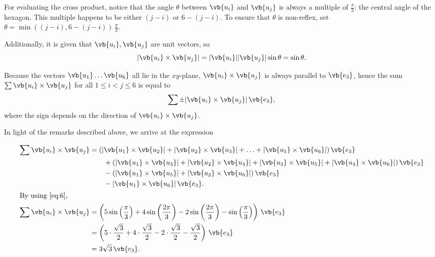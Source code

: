 \begin{enumerate}
        \smallskip

        \begin{remark}
            For evaluating the cross product, notice that the angle $\theta$ between $\vb{u_i}$ and $\vb{u_j}$ is always a multiple of $\frac{\pi}{3}$: the central angle of the hexagon.
            This multiple happens to be either $(j - i)$ or $6 - (j - i)$.
            To ensure that $\theta$ is non-reflex, set $\theta = \min((j - i), 6 - (j - i)) \, \frac{\pi}{3}$.
        \end{remark}

        Additionally, it is given that $\vb{u_i}, \vb{u_j}$ are unit vectors, so
        \begin{equation} \label{eq:6}
            |\vb{u_i} \times \vb{u_j}| = |\vb{u_i}| |\vb{u_j}| \sin \theta = \sin \theta.
        \end{equation}

        \smallskip

        \begin{remark}
            Because the vectors $\vb{u_1} \ldots \vb{u_6}$ all lie in the $xy$-plane, $\vb{u_i} \times \vb{u_j}$ is always parallel to $\vb{e_3}$, hence the sum $\sum \vb{u_i} \times \vb{u_j}$ for all $1 \le i < j \le 6$ is equal to
            \[ \sum \pm |\vb{u_i} \times \vb{u_j}| \, \vb{e_3}, \]
            where the sign depends on the direction of $\vb{u_i} \times \vb{u_j}$.
        \end{remark}

        \medskip

        In light of the remarks described above, we arrive at the expression
        \begin{spreadlines}{\baselineskip}
            \begin{align*}
                \sum \vb{u_i} \times \vb{u_j} &= (|\vb{u_1} \times \vb{u_2}| + |\vb{u_2} \times \vb{u_3}| + \ldots + |\vb{u_5} \times \vb{u_6}|) \, \vb{e_3} \\
                & \qquad + (|\vb{u_1} \times \vb{u_3}| + |\vb{u_2} \times \vb{u_4}| + |\vb{u_3} \times \vb{u_5}| + |\vb{u_4} \times \vb{u_6}|) \, \vb{e_3} \\
                & \qquad - (|\vb{u_1} \times \vb{u_5}| + |\vb{u_2} \times \vb{u_6}|) \, \vb{e_3} \\
                & \qquad - |\vb{u_1} \times \vb{u_6}| \, \vb{e_3}. \\
                \intertext{By using \cref{eq:6},}
                \sum \vb{u_i} \times \vb{u_j} &= \left(5 \sin\left(\frac{\pi}{3}\right) + 4 \sin\left(\frac{2 \pi}{3}\right) - 2 \sin\left(\frac{2 \pi}{3}\right) - \sin\left(\frac{\pi}{3}\right)\right) \, \vb{e_3} \\
                &= \left(5 \cdot \frac{\sqrt{3}}{2} + 4 \cdot \frac{\sqrt{3}}{2} - 2 \cdot \frac{\sqrt{3}}{2} - \frac{\sqrt{3}}{2}\right) \, \vb{e_3} \\
                &= 3 \sqrt{3} \, \vb{e_3}.
            \end{align*}
        \end{spreadlines}


\end{enumerate}
